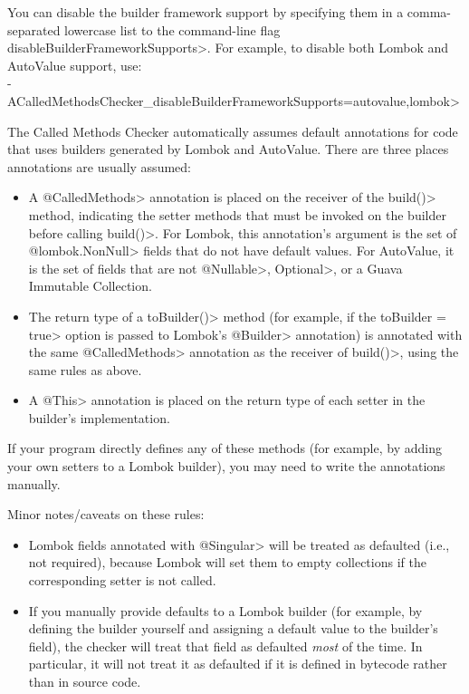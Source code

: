 You can disable the builder framework support by specifying them in a
comma-separated lowercase list to the command-line flag
\<disableBuilderFrameworkSupports>.  For example, to disable both Lombok
and AutoValue support, use: \\
\<-ACalledMethodsChecker\_disableBuilderFrameworkSupports=autovalue,lombok>

The Called Methods Checker automatically assumes default annotations for code that uses builders generated
by Lombok and AutoValue. There are three places annotations are usually assumed:
\begin{itemize}
\item A \<@CalledMethods> annotation is placed on the receiver of the
  \<build()> method, indicating the setter methods that must be invoked on
  the builder before calling \<build()>. For Lombok, this annotation's
  argument is the set of \<@lombok.NonNull> fields that do not have default
  values.  For AutoValue, it is the set of fields that are not
  \<@Nullable>, \<Optional>, or a Guava Immutable Collection.
\item The return type of a \<toBuilder()> method (for example, if the
  \<toBuilder = true> option is passed to Lombok's \<@Builder> annotation)
  is annotated with the same \<@CalledMethods> annotation as the receiver
  of \<build()>, using the same rules as above.
\item A \<@This> annotation is placed on the return type of each setter in
  the builder's implementation.
\end{itemize}

If your program directly defines any of these methods (for example, by adding your own setters to
a Lombok builder), you may need to write the annotations manually.

Minor notes/caveats on these rules:
\begin{itemize}
\item Lombok fields annotated with \<@Singular> will be treated as defaulted (i.e., not required), because
Lombok will set them to empty collections if the corresponding setter is not called.
\item If you manually provide defaults to a Lombok builder (for example, by defining the builder yourself
and assigning a default value to the builder's field), the checker will treat that field as defaulted
\emph{most} of the time. In particular, it will not treat it as defaulted if it is defined in bytecode rather
than in source code.
\end{itemize}


